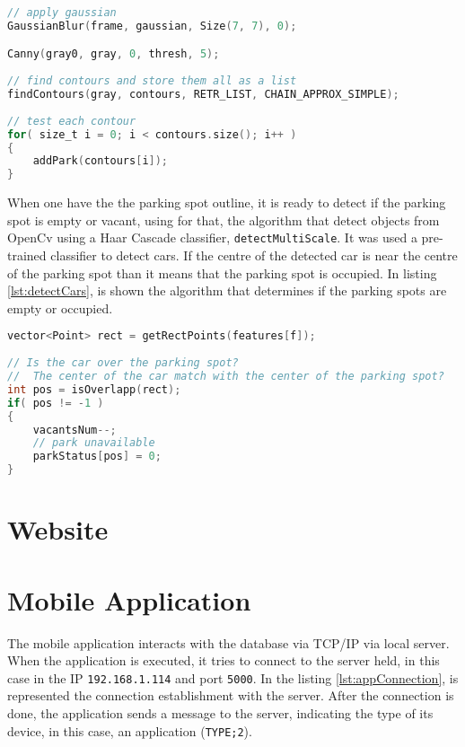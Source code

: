 \begin{lstlisting}[language=C, caption={Parking Spots Detection.}, label={lst:getOutline}]
// apply gaussian
GaussianBlur(frame, gaussian, Size(7, 7), 0);

Canny(gray0, gray, 0, thresh, 5);
		
// find contours and store them all as a list
findContours(gray, contours, RETR_LIST, CHAIN_APPROX_SIMPLE);
	
// test each contour
for( size_t i = 0; i < contours.size(); i++ )
{
	addPark(contours[i]);
}
\end{lstlisting}

When one have the the parking spot outline, it is ready to detect if the parking spot is empty or vacant, using for that, the algorithm that detect objects from OpenCv using a Haar Cascade classifier, \verb|detectMultiScale|. It was used a pre-trained classifier to detect cars. If the centre of the detected car is near the centre of the parking spot than it means that the parking spot is occupied. In listing \ref{lst:detectCars}, is shown the algorithm that determines if the parking spots are empty or occupied. 

\begin{lstlisting}[language=C, caption={Empty Parking Spots Detection.}, label={lst:detectCars}]
vector<Point> rect = getRectPoints(features[f]);
	
// Is the car over the parking spot?
//  The center of the car match with the center of the parking spot?
int pos = isOverlapp(rect);
if( pos != -1 )
{
	vacantsNum--;
	// park unavailable
	parkStatus[pos] = 0;
}
\end{lstlisting}

\section{Website}

\section{Mobile Application}

The mobile application interacts with the database via TCP/IP via local server. When the application is executed, it tries to connect to the server held, in this case in the IP \verb|192.168.1.114| and port \verb|5000|. In the listing \ref{lst:appConnection}, is represented the connection establishment with the server. After the connection is done, the application sends a message to the server, indicating the type of its device, in this case, an application (\verb|TYPE;2|).


